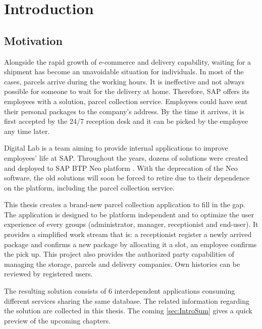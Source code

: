 \chapter{Introduction}
\label{ch:intro}

\section{Motivation}
Alongside the rapid growth of e-commerce and delivery capability, waiting for a shipment has become an unavoidable situation for individuals. In most of the cases, parcels arrive during the working hours. It is ineffective and not always possible for someone to wait for the delivery at home. Therefore, SAP \cite{sap} offers its employees with a solution, parcel collection service. Employees could have sent their personal packages to the company's address. By the time it arrives, it is first accepted by the 24/7 reception desk and it can be picked by the employee any time later.

Digital Lab is a team aiming to provide internal applications to improve employees' life at SAP. Throughout the years, dozens of solutions were created and deployed to SAP BTP \cite{btp} Neo platform \cite{neo}. With the deprecation of the Neo software, the old solutions will soon be forced to retire due to their dependence on the platform, including the parcel collection service.

This thesis creates a brand-new parcel collection application to fill in the gap. The application is designed to be platform independent and to optimize the user experience of every groups (administrator, manager, receptionist and end-user). It provides a simplified work stream that is: a receptionist register a newly arrived package and confirms a new package by allocating it a slot, an employee confirms the pick up. This project also provides the authorized party capabilities of managing the storage, parcels and delivery companies. Own histories can be reviewed by registered users.

The resulting solution consists of 6 interdependent applications consuming different services sharing the same database. The related information regarding the solution are collected in this thesis. The coming \autoref{sec:IntroSum} gives a quick preview of the upcoming chapters.


